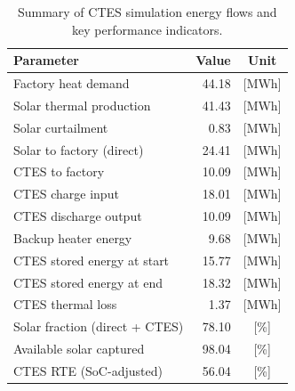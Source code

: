 \renewcommand{\arraystretch}{1.2}
\begin{table}[h]
\centering
\begin{tabular}{l|r c}
\hline
Parameter & Value & Unit \\
\hline
Factory heat demand & 44.18 & [MWh] \\
Solar thermal production & 41.43 & [MWh] \\
Solar curtailment & 0.83 & [MWh] \\
Solar to factory (direct) & 24.41 & [MWh] \\
CTES to factory & 10.09 & [MWh] \\
CTES charge input & 18.01 & [MWh] \\
CTES discharge output & 10.09 & [MWh] \\
Backup heater energy & 9.68 & [MWh] \\
CTES stored energy at start & 15.77 & [MWh] \\
CTES stored energy at end & 18.32 & [MWh] \\
CTES thermal loss & 1.37 & [MWh] \\
\hline
Solar fraction (direct + CTES) & 78.10 & [\%] \\
Available solar captured & 98.04 & [\%] \\
CTES RTE (SoC-adjusted) & 56.04 & [\%] \\
\hline
\end{tabular}
\caption{Summary of CTES simulation energy flows and key performance indicators.}
\label{tab:ctes-simulation-summary}
\end{table}
